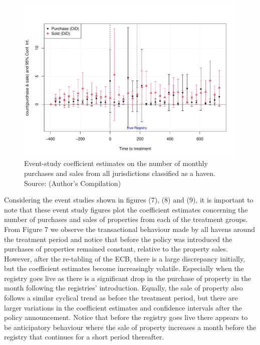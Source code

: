 \documentclass{article}
\begin{document}
\begin{figure}[H]
    \centering
    \includegraphics[width=1\linewidth]{haven_purchase.sale.pdf}
    \caption{Event-study coefficient estimates on the number of monthly purchases and sales from  all jurisdictions classified as a haven. \\ Source: (Author's Compilation)}
    \label{fig:enter-label}
\end{figure}

Considering the event studies shown in figures (7), (8) and (9), it is important to note that these event study figures plot the coefficient estimates concerning the number of purchases and sales of properties from each of the treatment groups. From Figure 7 we observe the transactional behaviour made by all havens around the treatment period and notice that before the policy was introduced the purchases of properties remained constant, relative to the property sales. However, after the re-tabling of the ECB, there is a large discrepancy initially, but the coefficient estimates become increasingly volatile. Especially when the registry goes live as there is a significant drop in the purchase of property in the month following the registries’ introduction.  Equally, the sale of property also follows a similar cyclical trend as before the treatment period, but there are larger variations in the coefficient estimates and confidence intervals after the policy announcement. Notice that before the registry goes live there appears to be anticipatory behaviour where the sale of property increases a month before the registry that continues for a short period thereafter.
\end{document}
